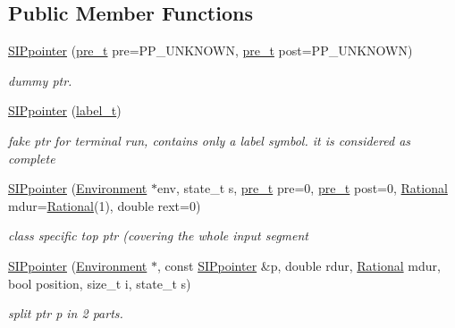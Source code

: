 \subsection*{Public Member Functions}
\begin{DoxyCompactItemize}
\item 
\mbox{\hyperlink{group__table_gac498892cd08ebd0663899dc82b00fac6}{S\+I\+Ppointer}} (\mbox{\hyperlink{group__general_ga092fe8b972dfa977c2a0886720a7731e}{pre\+\_\+t}} pre=P\+P\+\_\+\+U\+N\+K\+N\+O\+WN, \mbox{\hyperlink{group__general_ga092fe8b972dfa977c2a0886720a7731e}{pre\+\_\+t}} post=P\+P\+\_\+\+U\+N\+K\+N\+O\+WN)
\begin{DoxyCompactList}\small\item\em dummy ptr. \end{DoxyCompactList}\item 
\mbox{\hyperlink{group__table_gafcef62ae9e6a74448beec7ac040f6d7c}{S\+I\+Ppointer}} (\mbox{\hyperlink{group__output_ga22fde970e635fcf63962743b2d5c441d}{label\+\_\+t}})
\begin{DoxyCompactList}\small\item\em fake ptr for terminal run, contains only a label symbol. it is considered as complete \end{DoxyCompactList}\item 
\mbox{\hyperlink{group__table_ga5470d875405a71931e2349915201da20}{S\+I\+Ppointer}} (\mbox{\hyperlink{classEnvironment}{Environment}} $\ast$env, state\+\_\+t s, \mbox{\hyperlink{group__general_ga092fe8b972dfa977c2a0886720a7731e}{pre\+\_\+t}} pre=0, \mbox{\hyperlink{group__general_ga092fe8b972dfa977c2a0886720a7731e}{pre\+\_\+t}} post=0, \mbox{\hyperlink{classRational}{Rational}} mdur=\mbox{\hyperlink{classRational}{Rational}}(1), double rext=0)
\begin{DoxyCompactList}\small\item\em class specific top ptr (covering the whole input segment \end{DoxyCompactList}\item 
\mbox{\hyperlink{group__table_gaeea3246bf0f27b8b4a0a930f7d1a4379}{S\+I\+Ppointer}} (\mbox{\hyperlink{classEnvironment}{Environment}} $\ast$, const \mbox{\hyperlink{classSIPpointer}{S\+I\+Ppointer}} \&p, double rdur, \mbox{\hyperlink{classRational}{Rational}} mdur, bool position, size\+\_\+t i, state\+\_\+t s)
\begin{DoxyCompactList}\small\item\em split ptr p in 2 parts. \end{DoxyCompactList}\item 

\end{DoxyCompactItemize}
